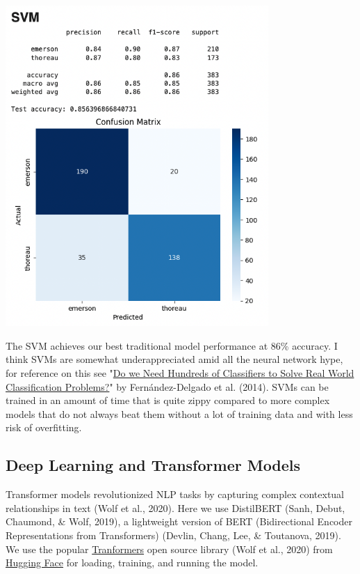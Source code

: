 \documentclass[
]{article}
\begin{document}
\includegraphics[width=0.75\textwidth]{svm_confusion.png}

The SVM achieves our best traditional model performance at 86\%
accuracy. I think SVM\textquotesingle s are somewhat underappreciated
amid all the neural network hype, for reference on this see
"\href{https://dl.acm.org/doi/10.5555/2627435.2697065}{Do we Need
Hundreds of Classifiers to Solve Real World Classification Problems?}"
by Fernández-Delgado et al. (2014). SVMs can be trained in an amount of
time that is quite zippy compared to more complex models that do not
always beat them without a lot of training data and with less risk of
overfitting.

\subsection{Deep Learning and Transformer
Models}\label{deep-learning-and-transformer-models}

Transformer models revolutionized NLP tasks by capturing complex
contextual relationships in text (Wolf et al., 2020). Here we use
DistilBERT (Sanh, Debut, Chaumond, \& Wolf, 2019), a lightweight version
of BERT (Bidirectional Encoder Representations from Transformers)
(Devlin, Chang, Lee, \& Toutanova, 2019). We use the popular
\href{https://github.com/huggingface/transformers}{Tranformers} open
source library (Wolf et al., 2020) from
\href{https://huggingface.co/}{Hugging Face} for loading, training, and running the model.
\end{document}
